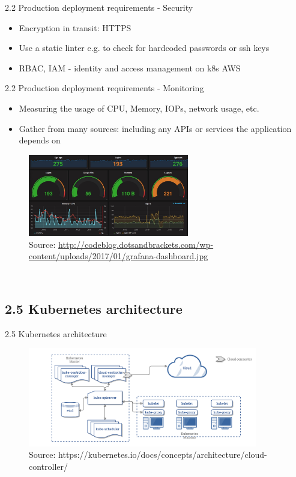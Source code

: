 \documentclass{beamer}
\begin{document}
\begin{frame}{2.2 Production deployment requirements - Security}%
\begin{itemize}
	\item Encryption in transit: HTTPS
	\item Use a static linter e.g. to check for hardcoded passwords or ssh keys
	\item RBAC, IAM - identity and access management on k8s AWS
\end{itemize}
\end{frame}

\begin{frame}{2.2 Production deployment requirements - Monitoring}%
\begin{itemize}
	\item Measuring the usage of CPU, Memory, IOPs, network usage, etc.
	\item Gather from many sources: including any APIs or services
	the application depends on
\end{itemize}
\begin{figure}
	\includegraphics[width=7cm]{figures/grafana.jpeg}
	\label{fig:grafana} \\
	\tiny{Source: \url{http://codeblog.dotsandbrackets.com/wp-content/uploads/2017/01/grafana-dashboard.jpg}}
\end{figure}
\\
\end{frame}

\subsection{2.5 Kubernetes architecture}
\begin{frame}{2.5 Kubernetes architecture}%
\begin{figure}
	\includegraphics[width=10cm]{figures/k8s-arch.png}
	\label{fig:k8s-arch}
	\tiny{Source: https://kubernetes.io/docs/concepts/architecture/cloud-controller/}
\end{figure}
\end{frame}
\end{document}
